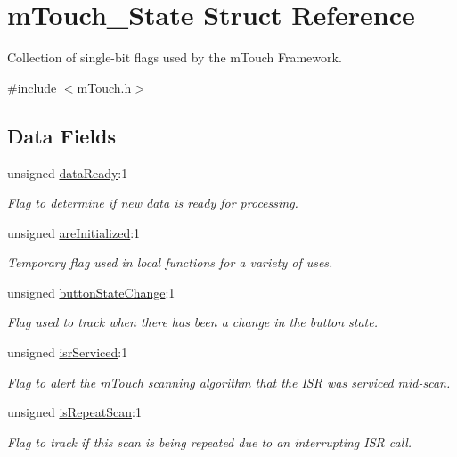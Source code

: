 \hypertarget{structm_touch___state}{}\section{m\+Touch\+\_\+\+State Struct Reference}
\label{structm_touch___state}


Collection of single-\/bit flags used by the m\+Touch Framework.  




{\ttfamily \#include $<$m\+Touch.\+h$>$}

\subsection*{Data Fields}
\begin{DoxyCompactItemize}
\item 
unsigned \hyperlink{structm_touch___state_af799217cbdcc2ac20907a19c9b62a0d5}{data\+Ready}\+:1
\begin{DoxyCompactList}\small\item\em Flag to determine if new data is ready for processing. \end{DoxyCompactList}\item 
unsigned \hyperlink{structm_touch___state_ab1320a2e9a938dad2a563147945e97f9}{are\+Initialized}\+:1
\begin{DoxyCompactList}\small\item\em Temporary flag used in local functions for a variety of uses. \end{DoxyCompactList}\item 
unsigned \hyperlink{structm_touch___state_a915c76d157542b9acb3bfca42e0c4913}{button\+State\+Change}\+:1
\begin{DoxyCompactList}\small\item\em Flag used to track when there has been a change in the button state. \end{DoxyCompactList}\item 
unsigned \hyperlink{structm_touch___state_a98199bfb33a755cb711b9119e571bd7d}{isr\+Serviced}\+:1
\begin{DoxyCompactList}\small\item\em Flag to alert the m\+Touch scanning algorithm that the I\+S\+R was serviced mid-\/scan. \end{DoxyCompactList}\item 
unsigned \hyperlink{structm_touch___state_a815e542816b6deaf4affac094c2897d4}{is\+Repeat\+Scan}\+:1
\begin{DoxyCompactList}\small\item\em Flag to track if this scan is being repeated due to an interrupting I\+S\+R call. \end{DoxyCompactList}\item 

\end{DoxyCompactItemize}
